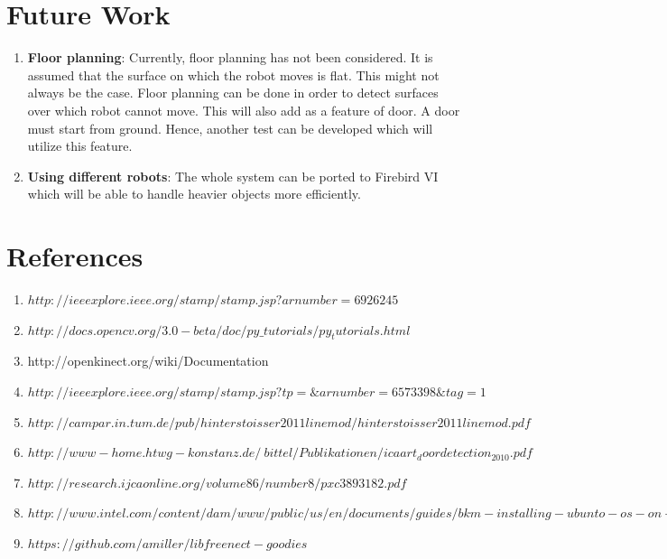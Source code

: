 \documentclass{report}
\begin{document}
\chapter{Future Work}

\begin{enumerate}
 \item \textbf{Floor planning}: Currently, floor planning has not been considered. It is assumed that the surface on which the
 robot moves is flat. This might not always be the case. Floor planning can be done in order to detect surfaces over which robot
 cannot move. This will also add as a feature of door. A door must start from ground. Hence, another test can be developed
 which will utilize this feature.
 
 \item \textbf{Using different robots}: The whole system can be ported to Firebird VI which will be able to handle heavier objects more efficiently.
\end{enumerate}

\chapter{References}
\begin{enumerate}
 \item $http://ieeexplore.ieee.org/stamp/stamp.jsp?arnumber=6926245$
 \item $http://docs.opencv.org/3.0-beta/doc/py\_tutorials/py_tutorials.html$
 \item http://openkinect.org/wiki/Documentation
 \item $http://ieeexplore.ieee.org/stamp/stamp.jsp?tp=\&arnumber=6573398\&tag=1$
 \item $http://campar.in.tum.de/pub/hinterstoisser2011linemod/hinterstoisser2011linemod.pdf$
 \item $http://www-home.htwg-konstanz.de/~bittel/Publikationen/icaart_doordetection_2010.pdf$
 \item $http://research.ijcaonline.org/volume86/number8/pxc3893182.pdf$
 \item $http://www.intel.com/content/dam/www/public/us/en/documents/guides/bkm-installing-ubunto-os-on-de2i-150-board-guide.pdf$
 \item $https://github.com/amiller/libfreenect-goodies$
\end{enumerate}
 
\end{document}
